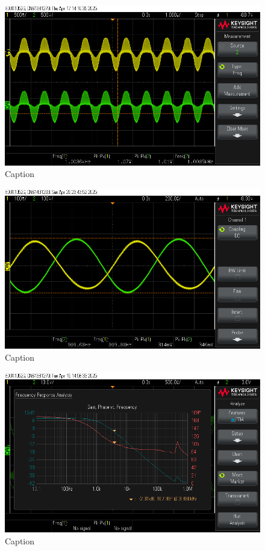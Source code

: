\documentclass[conference]{IEEEtran}
\begin{document}
\begin{figure}
    \centering
    \includegraphics[width=1\linewidth]{Images/modulated_demodulated.png}
    \caption{Caption}
\end{figure}

\begin{figure}
    \centering
    \includegraphics[width=1\linewidth]{Images/final_out_circuit.png}
    \caption{Caption}
\end{figure}

\begin{figure}
    \centering
    \includegraphics[width=1\linewidth]{Images/filter_response.png}
    \caption{Caption}
\end{figure}
\end{document}
